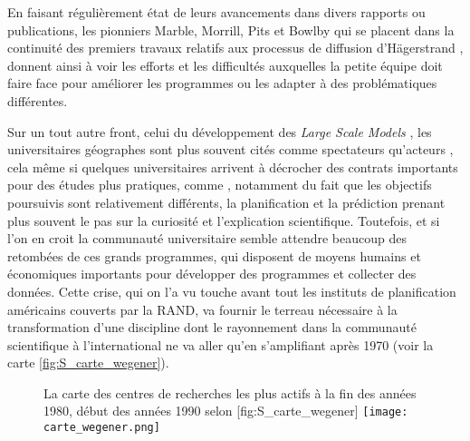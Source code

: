 En faisant régulièrement état de leurs avancements dans divers rapports ou publications, les pionniers Marble, Morrill, Pits et Bowlby \autocite{Pitts1963} qui se placent dans la continuité des premiers travaux relatifs aux processus de diffusion d'Hägerstrand \autocite{Hagerstrand1953, Hagerstrand1967a}, donnent ainsi à voir les efforts et les difficultés auxquelles la petite équipe doit faire face pour améliorer les programmes ou les adapter à des problématiques différentes.

Sur un tout autre front, celui du développement des \textit{Large Scale Models} \autocites[8]{Batty1976}, les universitaires géographes sont plus souvent cités comme spectateurs qu'acteurs \autocites[9]{Batty1994}[153]{Batty1989}, cela même si quelques universitaires arrivent à décrocher des contrats importants \autocite{Barnes2006a} pour des études plus pratiques, comme \textcite{Garrison1959}, notamment du fait que les objectifs poursuivis sont relativement différents, la planification et la prédiction prenant plus souvent le pas sur la curiosité et l'explication scientifique. Toutefois, et si l'on en croit \textcite{Haggett1969} la communauté universitaire semble attendre beaucoup des retombées de ces grands programmes, qui disposent de moyens humains et économiques importants pour développer des programmes et collecter des données. Cette crise, qui on l'a vu touche avant tout les instituts de planification américains couverts par la RAND, va fournir le terreau nécessaire à la transformation d'une discipline dont le rayonnement dans la communauté scientifique à l'international ne va aller qu'en s'amplifiant après 1970 (voir la carte \ref{fig:S_carte_wegener}).

\begin{figure}[htbp]
\begin{sidecaption}[fortoc]{La carte des centres de recherches les plus actifs à la fin des années 1980, début des années 1990 selon \textcite{Wegener1994}}[fig:S_carte_wegener]
  \centering
 \texttt{[image: carte\_wegener.png]}
  \end{sidecaption}
\end{figure}

